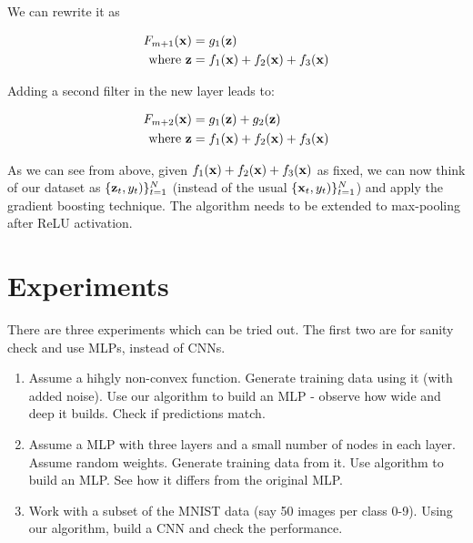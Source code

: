 \documentclass{article}
\begin{document}
We can rewrite it as

\begin{align}
F_{m+1}({\bf x}) &= g_1({\bf z}) \\
\textrm{where } {\bf z} &= f_1({\bf x})+ f_2({\bf x})  + f_3({\bf x})
\end{align}

Adding a second filter in the new layer leads to:

\begin{align}
F_{m+2}({\bf x}) &= g_1({\bf z}) + g_2({\bf z})\\
\textrm{where } {\bf z} &= f_1({\bf x})+ f_2({\bf x})  + f_3({\bf x})
\end{align}

As we can see from above, given $f_1({\bf x})+ f_2({\bf x})  + f_3({\bf x})$ as fixed, we can now think of our dataset as $\{{\bf z}_t, y_t)\}_{t = 1}^{N}$ (instead of the usual $\{{\bf x}_t, y_t)\}_{t = 1}^{N}$) and apply the gradient boosting technique. The algorithm needs to be extended to max-pooling after ReLU activation.

\section{Experiments}
\label{sec:Experiments}

There are three experiments which can be tried out. The first two are for sanity check and use MLPs, instead of CNNs.

\begin{enumerate}
\item Assume a hihgly non-convex function. Generate training data using it (with added noise). Use our algorithm to build an MLP - observe how wide and deep it builds. Check if predictions match.  
\item Assume a MLP with three layers and a small number of nodes in each layer. Assume random weights. Generate training data from it. Use algorithm to build an MLP. See how it differs from the original MLP.
\item Work with a subset of the MNIST data (say 50 images per class 0-9). Using our algorithm, build a CNN and check the performance.
\end{enumerate}

\newpage


\end{document}
